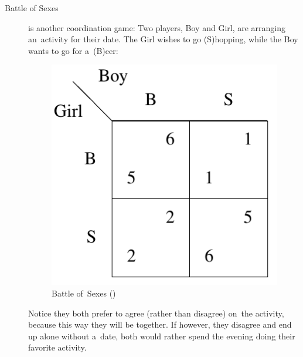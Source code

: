\begin{description}
  \item [Battle of Sexes] is another coordination game:
    Two players, Boy and Girl, are arranging an~activity for their date.
    The Girl wishes to go (S)hopping, while the Boy wants to go for a~(B)eer:
    \begin{figure}[H]
      \centering
      \includegraphics[width=.23\paperwidth]{../img/battle-of-sexes.png}
      \caption[Battle of~Sexes]{Battle of~Sexes (\cite{AGT07})}
      \label{fig:battle-of-sexes}
    \end{figure}
    Notice they both prefer to agree (rather than disagree) on~the activity, because this way they will be together.
    If however, they disagree and end up alone without a~date, both would rather spend the evening doing their favorite activity.
\end{description}

